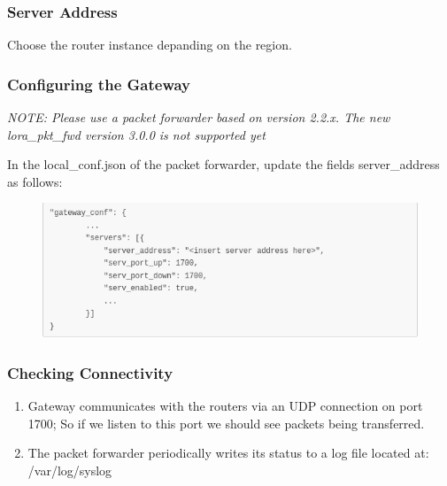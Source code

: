 \documentclass[a4paper]{article}
\begin{document}
\subsubsection{Server Address}
Choose the router instance depanding on the region. 
\newline {}\par

\subsubsection{Configuring the Gateway}
\textit{NOTE: Please use a packet forwarder based on version 2.2.x. The new lora\_pkt\_fwd version 3.0.0 is not supported yet}\par
In the local\_conf.json of the packet forwarder, update the fields server\_address as follows:

\begin{figure}[h]
\centering
\includegraphics[width=1\textwidth]{config_gateway.png}
\caption{\label{fig:config_gateway}}
\end{figure}

\subsubsection{Checking Connectivity}
\begin{enumerate}
 \item Gateway communicates with the routers via an UDP connection on port 1700; So if we listen to this port we should see packets being transferred.
\newline {}\par
\item The packet forwarder periodically writes its status to a log file located at: /var/log/syslog
\newline {}\par
\end{enumerate}
\end{document}
